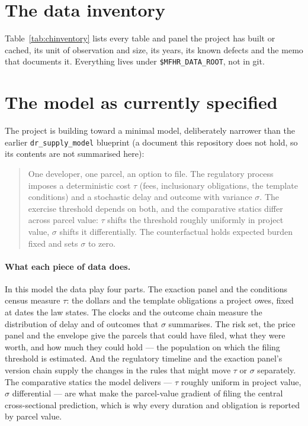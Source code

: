 \documentclass[11pt]{article}
\newcommand{\chtable}[1]{\FloatBarrier\def\chtab{#1}}
\begin{document}
\section{The data inventory}\label{sec:chinventory}

Table~\ref{tab:chinventory} lists every table and panel the project has built or cached, its
unit of observation and size, its years, its known defects and the memo that documents it.
Everything lives under \texttt{\$MFHR\_DATA\_ROOT}, not in git.

\chtable{inventory}

\section{The model as currently specified}\label{sec:chmodel}

The project is building toward a minimal model, deliberately narrower than the earlier
\texttt{dr\_supply\_model} blueprint (a document this repository does not hold, so its contents are
not summarised here):

\begin{quote}
One developer, one parcel, an option to file. The regulatory process imposes a deterministic cost
$\tau$ (fees, inclusionary obligations, the template conditions) and a stochastic delay and
outcome with variance $\sigma$. The exercise threshold depends on both, and the comparative
statics differ across parcel value: $\tau$ shifts the threshold roughly uniformly in project value,
$\sigma$ shifts it differentially. The counterfactual holds expected burden fixed and sets
$\sigma$ to zero.
\end{quote}

\paragraph{What each piece of data does.} In this model the data play four parts. The
exaction panel and the conditions census measure $\tau$: the dollars and the template obligations
a project owes, fixed at dates the law states. The clocks and the outcome chain measure the
distribution of delay and of outcomes that $\sigma$ summarises. The risk set, the price panel and
the envelope give the parcels that could have filed, what they were worth, and how much they
could hold --- the population on which the filing threshold is estimated. And the regulatory
timeline and the exaction panel's version chain supply the changes in the rules that might move
$\tau$ or $\sigma$ separately. The comparative statics the model delivers --- $\tau$ roughly
uniform in project value, $\sigma$ differential --- are what make the parcel-value gradient of
filing the central cross-sectional prediction, which is why every duration and obligation is
reported by parcel value.
\end{document}

